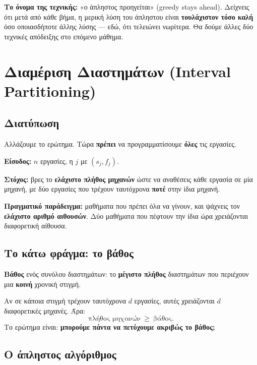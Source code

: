 \documentclass[11pt,a4paper]{article}
\begin{document}
\begin{intuition}
\textbf{Το όνομα της τεχνικής:} «ο άπληστος προηγείται» (greedy stays ahead).
Δείχνεις ότι μετά από κάθε βήμα, η μερική λύση του άπληστου είναι
\textbf{τουλάχιστον τόσο καλή} όσο οποιασδήποτε άλλης λύσης --- εδώ, ότι
τελειώνει νωρίτερα. Θα δούμε άλλες δύο τεχνικές απόδειξης στο επόμενο μάθημα.
\end{intuition}

\section{Διαμέριση Διαστημάτων (Interval Partitioning)}

\subsection{Διατύπωση}

Αλλάζουμε το ερώτημα. Τώρα \textbf{πρέπει} να προγραμματίσουμε \textbf{όλες} τις
εργασίες.

\textbf{Είσοδος:} $n$ εργασίες, η $j$ με $(s_j, f_j)$.

\textbf{Στόχος:} βρες το \textbf{ελάχιστο πλήθος μηχανών} ώστε να αναθέσεις κάθε
εργασία σε μία μηχανή, με δύο εργασίες που τρέχουν ταυτόχρονα \textbf{ποτέ} στην
ίδια μηχανή.

\begin{intuition}
\textbf{Πραγματικό παράδειγμα:} μαθήματα που πρέπει όλα να γίνουν, και ψάχνεις
τον \textbf{ελάχιστο αριθμό αιθουσών}. Δύο μαθήματα που πέφτουν την ίδια ώρα
χρειάζονται διαφορετική αίθουσα.
\end{intuition}

\subsection{Το κάτω φράγμα: το βάθος}

\begin{keypoint}
\textbf{Βάθος} ενός συνόλου διαστημάτων: το \textbf{μέγιστο πλήθος} διαστημάτων
που περιέχουν μια \textbf{κοινή} χρονική στιγμή.
\end{keypoint}

Αν σε κάποια στιγμή τρέχουν ταυτόχρονα $d$ εργασίες, αυτές χρειάζονται $d$
διαφορετικές μηχανές. Άρα:
\[
\text{πλήθος μηχανών} \ \ge\ \text{βάθος}.
\]
Το ερώτημα είναι: \textbf{μπορούμε πάντα να πετύχουμε ακριβώς το βάθος;}

\subsection{Ο άπληστος αλγόριθμος}
\end{document}
